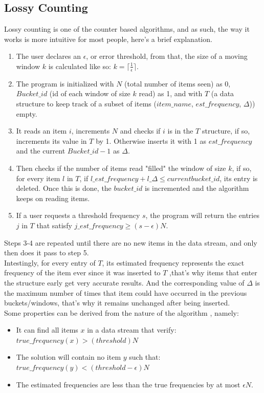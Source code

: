 \documentclass[...]{revdetua}
\begin{document}
\subsection{Lossy Counting}
Lossy counting is one of the counter based algorithms, and as such, the way it works is more intuitive for most people, here's a brief explanation.\par
\begin{enumerate}
\item The user declares an $\epsilon$, or error threshold, from that, the size of a moving window $k$ is calculated like so: $k=\lceil\frac{1}{\epsilon}\rceil$.
\item The program is initialized with $N$ (total number of items seen) as 0, $Bucket\_id$ (id of each window of size $k$ read) as 1, and with $T$ (a data structure to keep track of a subset of items ($item\_name$, $est\_frequency$, $\Delta$)) empty.
\item It reads an item $i$, increments $N$ and checks if $i$ is in the $T$ structure, if so, increments its value in $T$ by 1. Otherwise inserts it with 1 as $est\_frequency$ and the current $Bucket\_id - 1$ as $\Delta$.
\item Then checks if the number of items read "filled" the window of size $k$, if so, for every item $l$ in $T$, if $l\_est\_frequency + l\_\Delta \leq current bucket\_id$, its entry is deleted. Once this is done, the $bucket\_id$ is incremented and the algorithm keeps on reading items.
\item If a user requests a threshold  frequency $s$, the program will return the entries $j$ in $T$ that satisfy $j\_est\_frequency \geq (s-\epsilon)N$.
\end{enumerate}
Steps 3-4 are repeated until there are no new items in the data stream, and only then does it pass to step 5.\\
Intestingly, for every entry of $T$, its estimated frequency represents the exact frequency of the item ever since it was inserted to $T$ \cite{Manku},that's why items that enter the structure early get very accurate results. And the corresponding value of $\Delta$ is the maximum number of times that item could have occurred in the previous buckets/windows, that's why it remains unchanged after being inserted.\\
Some properties can be derived from the nature of the algorithm \cite{Manku}, namely:
\begin{itemize}
\item It can find all items $x$ in a data stream that verify: $true\_frequency(x)>(threshold)N$
\item The solution will contain no item $y$ such that: $true\_frequency(y)<(threshold-\epsilon)N$
\item The estimated frequencies are less than the true frequencies by at most $\epsilon N$.
\end{itemize}
\end{document}
